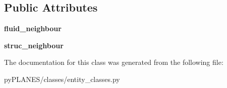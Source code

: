 \subsection*{Public Attributes}
\begin{DoxyCompactItemize}
\item 
\mbox{\label{classpy_p_l_a_n_e_s_1_1classes_1_1entity__classes_1_1_fluid_structure_fem_a815d55908cb15a9240b88d4a5a636a09}} 
{\bfseries fluid\+\_\+neighbour}
\item 
\mbox{\label{classpy_p_l_a_n_e_s_1_1classes_1_1entity__classes_1_1_fluid_structure_fem_a0d967d9b060bedc6c46739ff3c0e3604}} 
{\bfseries struc\+\_\+neighbour}
\end{DoxyCompactItemize}


The documentation for this class was generated from the following file\+:\begin{DoxyCompactItemize}
\item 
py\+P\+L\+A\+N\+E\+S/classes/entity\+\_\+classes.\+py\end{DoxyCompactItemize}
